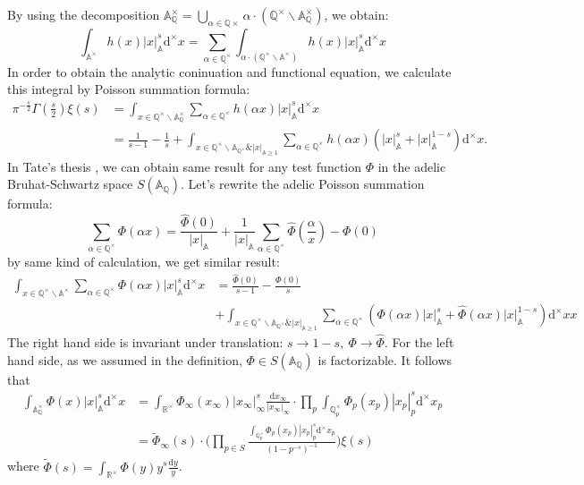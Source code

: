 \documentclass[12pt,a4paper,english]{article}
\theoremstyle{plain}
\theoremstyle{definition}
\begin{document}
By using the decomposition $\mathbb{A}^{\times}_{\mathbb{Q}}=\bigcup_{\alpha\in\mathbb{Q\times}}\alpha\cdot(\mathbb{Q}^{\times}\backslash\mathbb{A}^{\times}_{\mathbb{Q}})$, we obtain:
\begin{equation*}
    \int_{\mathbb{A}^{\times}}h(x)|x|^{s}_{\mathbb{A}}\text{d}^{\times}x=\sum_{\alpha\in\mathbb{Q}^{\times}}\int_{\alpha\cdot(\mathbb{Q}^{\times}\backslash\mathbb{A}^{\times})}h(x)|x|^{s}_{\mathbb{A}}\text{d}^{\times}x
\end{equation*}
In order to obtain the analytic coninuation and functional equation, we calculate this integral by Poisson summation formula:
\begin{align*}
    \pi^{-\frac{s}{2}}\Gamma(\frac{s}{2})\xi(s)&=\int_{x\in\mathbb{Q}^{\times}\backslash\mathbb{A}^{\times}_{\mathbb{Q}}}\sum_{\alpha\in\mathbb{Q}^{\times}}h(\alpha x)|x|^{s}_{\mathbb{A}}\text{d}^{\times}x\\
   &=\frac{1}{s-1}-\frac{1}{s}+\int_{x\in\mathbb{Q}^{\times}\backslash\mathbb{A}_{\mathbb{Q}^{\times}}\& |x|_{\mathbb{A}\geq 1}}\sum_{\alpha\in\mathbb{Q}^{\times}}h(\alpha x)(|x|^{s}_{\mathbb{A}}+|x|^{1-s}_{\mathbb{A}})\text{d}^{\times}x.
\end{align*}
In Tate's thesis \cite{tate1997fourier}, we can obtain same result for any test function $\Phi$ in the adelic Bruhat-Schwartz space $S(\mathbb{A}_{\mathbb{Q}})$. Let's rewrite the adelic Poisson summation formula:
\begin{equation*}
    \sum_{\alpha\in\mathbb{Q}^{\times}}\Phi(\alpha x)=\frac{\hat{\Phi}(0)}{|x|_{\mathbb{A}}}+\frac{1}{|x|_{\mathbb{A}}}\sum_{\alpha\in\mathbb{Q}^{\times}}\hat{\Phi}(\frac{\alpha}{x})-\Phi(0)
\end{equation*}
by same kind of calculation, we get similar result:
\begin{align*}
    \int_{x\in \mathbb{Q}^{\times}\backslash\mathbb{A}^{\times}}\sum_{\alpha\in\mathbb{Q}^{\times}}\Phi(\alpha x)|x|^{s}_{\mathbb{A}}\text{d}^{\times}x&=\frac{\hat{\Phi}(0)}{s-1}-\frac{\Phi(0)}{s}\\
    &+\int_{x\in\mathbb{Q}^{\times}\backslash\mathbb{A}_{\mathbb{Q}^{\times}}\& |x|_{\mathbb{A}\geq 1}}\sum_{\alpha\in\mathbb{Q}^{\times}}(\Phi(\alpha x)|x|^{s}_{\mathbb{A}}+\hat{\Phi}(\alpha x)|x|^{1-s}_{\mathbb{A}})\text{d}^{\times}xx
\end{align*}
The right hand side is invariant under translation: $s\rightarrow 1-s,\ \Phi\rightarrow \hat{\Phi}$. For the left hand side, as we assumed in the definition, $\Phi\in S(\mathbb{A}_{\mathbb{Q}})$ is factorizable. It follows that
\begin{align*}
    \int_{\mathbb{A}^{\times}_{\mathbb{Q}}}\Phi(x)|x|^{s}_{\mathbb{A}}\text{d}^{\times}x&=\int_{\mathbb{R}^{\times}}\Phi_{\infty}(x_{\infty})|x_{\infty}|^{s}_{\infty}\frac{\text{d}x_{\infty}}{|x_{\infty}|_{\infty}}\cdot\prod_{p}\int_{\mathbb{Q}^{\times}_{p}}\Phi_{p}(x_{p})|x_{p}|^{s}_{p}\text{d}^{\times}x_{p}\\
    &=\widetilde{\Phi}_{\infty}(s)\cdot\bigg(\prod_{p\in S}\frac{\int_{\mathbb{Q}^{\times}_{p}}\Phi_{p}(x_{p})|x_{p}|_{p}^{s}\text{d}^{\times}x_{p}}{(1-p^{-s})^{-1}}\bigg)\xi(s)
\end{align*}
where $\widetilde{\Phi}(s)=\int_{\mathbb{R}^{\times}}\Phi(y)y^{s}\frac{\text{d}y}{y}$.
\end{document}
